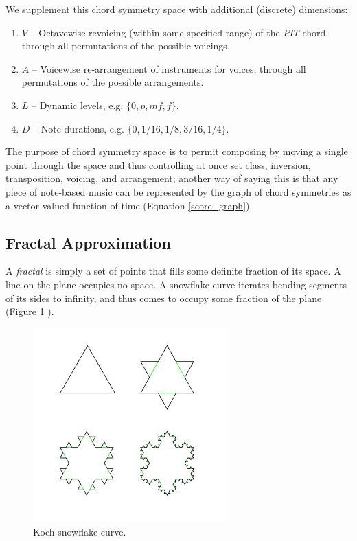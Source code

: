 \documentclass[english,11pt,letterpaper,onecolumn]{scrartcl}
\numberwithin{equation}{section}
\begin{document}
\noindent We supplement this chord symmetry space with additional (discrete)
dimensions:

\begin{enumerate}[resume]
\item $V$ -- Octavewise revoicing (within some specified range) of the $PIT$
chord, through all permutations of the possible voicings.
\item $A$ -- Voicewise re-arrangement of instruments for voices, through all
permutations of the possible arrangements.
\item $L$ -- Dynamic levels, e.g. $\{0, p, \mathit{mf}, f\}$.
\item $D$ -- Note durations, e.g. $\{0, 1/16, 1/8, 3/16, 1/4\}$.
\end{enumerate}

\noindent The purpose of chord symmetry space is to permit composing by moving a
single point through the space and thus controlling at once set class,
inversion, transposition, voicing, and arrangement; another way of saying this
is that any piece of note-based music can be represented by the graph of chord
symmetries as a vector-valued function of time (Equation \eqref{score_graph}).

\subsection{Fractal Approximation}

A \textit{fractal} is simply a set of points that fills some definite fraction
of its space. A line on the plane occupies no space. A snowflake curve
iterates bending segments of its sides to infinity, and thus comes to occupy
some fraction of the plane (Figure \ref{fig:kochflake}
\cite{Mandelbrot:1982:FGN}).

\begin{figure}
\centerline{\includegraphics[width = 0.6667\textwidth]{KochFlake}}
\caption{\label{fig:kochflake} Koch snowflake
curve.\protect\footnotemark}
\end{figure}
\end{document}
